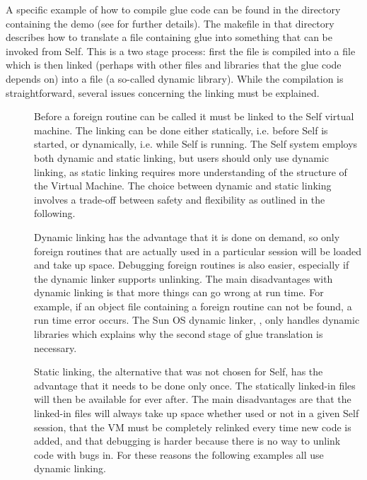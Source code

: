 \documentclass[letterpaper,10pt,english]{sphinxmanual}
\begin{document}
A specific example of how to compile glue code can be found in the directory containing the 
demo (see {\hyperref[\detokenize{vmref:a-complete-application-using-foreign-functions}]{}} for further details). The makefile in that directory describes how to
translate a  file containing glue into something that can be invoked from Self. This is a two
stage process: first the  file is compiled into a  file which is then linked (perhaps with other
 files and libraries that the glue code depends on) into a  file (a so-called dynamic library).
While the compilation is straightforward, several issues concerning the linking must be explained.
\begin{description}
\item[{}] \leavevmode
Before a foreign routine can be called it must be linked to the Self virtual machine. The
linking can be done either statically, i.e. before Self is started, or dynamically, i.e. while Self is
running. The Self system employs both dynamic and static linking, but users should only use dynamic
linking, as static linking requires more understanding of the structure of the Virtual Machine.
The choice between dynamic and static linking involves a trade-off between safety and
flexibility as outlined in the following.

\item[{}] \leavevmode
Dynamic linking has the advantage that it is done on demand, so only foreign routines that are actually
used in a particular session will be loaded and take up space. Debugging foreign routines is
also easier, especially if the dynamic linker supports unlinking. The main disadvantages with dynamic
linking is that more things can go wrong at run time. For example, if an object file containing
a foreign routine can not be found, a run time error occurs. The Sun OS dynamic linker, ,
only handles dynamic libraries which explains why the second stage of glue translation is necessary.

\item[{}] \leavevmode
Static linking, the alternative that was not chosen for Self, has the advantage that it needs to be
done only once. The statically linked-in files will then be available for ever after. The main disadvantages
are that the linked-in files will always take up space whether used or not in a given Self
session, that the VM must be completely relinked every time new code is added, and that debugging
is harder because there is no way to unlink code with bugs in. For these reasons the following
examples all use dynamic linking.

\end{description}
\end{document}
